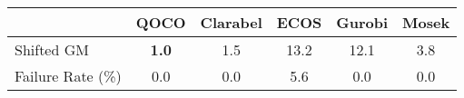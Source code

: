 \begin{tabular}{lccccc}
  \hline
   & \textbf{QOCO} & \textbf{Clarabel} & \textbf{ECOS} & \textbf{Gurobi} & \textbf{Mosek} \\ \hline
  Shifted GM & \textbf{1.0} & 1.5 & 13.2 & 12.1 & 3.8 \\ 
  Failure Rate (\%) & 0.0 & 0.0 & 5.6 & 0.0 & 0.0 \\ \hline 
\end{tabular}
